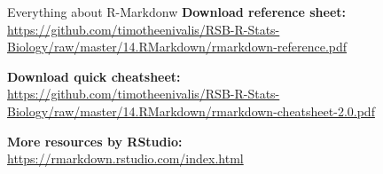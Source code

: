 \documentclass[10pt]{beamer}\usepackage[]{graphicx}\usepackage[]{color}
\begin{document}
\begin{frame}{Everything about R-Markdonw}
\textbf{Download reference sheet:}\\
\url{https://github.com/timotheenivalis/RSB-R-Stats-Biology/raw/master/14.RMarkdown/rmarkdown-reference.pdf}

\textbf{Download quick cheatsheet:}\\
\url{https://github.com/timotheenivalis/RSB-R-Stats-Biology/raw/master/14.RMarkdown/rmarkdown-cheatsheet-2.0.pdf}

\textbf{More resources by RStudio:}\\
\url{https://rmarkdown.rstudio.com/index.html}

\end{frame}
\end{document}
